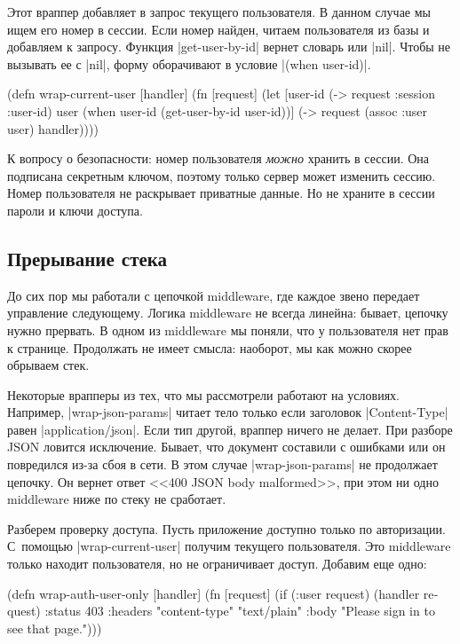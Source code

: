 Этот враппер добавляет в запрос текущего пользователя. В данном случае мы ищем
его номер в сессии. Если номер найден, читаем пользователя из базы и добавляем к
запросу. Функция \spverb|get-user-by-id| вернет словарь или \spverb|nil|. Чтобы
не вызывать ее с \spverb|nil|, форму оборачивают в условие \spverb|(when user-id)|.

\begin{english}
  \begin{clojure}
(defn wrap-current-user [handler]
  (fn [request]
    (let [user-id (-> request :session :user-id)
          user (when user-id
                 (get-user-by-id user-id))]
      (-> request
          (assoc :user user)
          handler))))
  \end{clojure}
\end{english}

К вопросу о безопасности: номер пользователя \emph{можно} хранить в сессии. Она
подписана секретным ключом, поэтому только сервер может изменить сессию. Номер
пользователя не раскрывает приватные данные. Но не храните в сессии пароли и
ключи доступа.

\subsection{Прерывание стека}

До сих пор мы работали с цепочкой middleware, где каждое звено передает
управление следующему. Логика middleware не всегда линейна: бывает, цепочку
нужно прервать. В одном из middleware мы поняли, что у пользователя нет прав к
странице. Продолжать не имеет смысла: наоборот, мы как можно скорее обрываем
стек.

Некоторые врапперы из тех, что мы рассмотрели работают на условиях. Например,
\spverb|wrap-json-params| читает тело только если заголовок
\spverb|Content-Type| равен \spverb|application/json|. Если тип другой, враппер
ничего не делает. При разборе JSON ловится исключение. Бывает, что документ
составили с ошибками или он повредился из-за сбоя в сети. В этом случае
\spverb|wrap-json-params| не продолжает цепочку. Он вернет ответ <<400 JSON body
malformed>>, при этом ни одно middleware ниже по стеку не сработает.

Разберем проверку доступа. Пусть приложение доступно только по
авторизации. С~помощью \spverb|wrap-current-user| получим текущего
пользователя. Это middleware только находит пользователя, но не ограничивает
доступ. Добавим еще одно:

\begin{english}
  \begin{clojure}
(defn wrap-auth-user-only [handler]
  (fn [request]
    (if (:user request)
      (handler request)
      {:status 403
       :headers {"content-type" "text/plain"}
       :body "Please sign in to see that page."})))
  \end{clojure}
\end{english}


